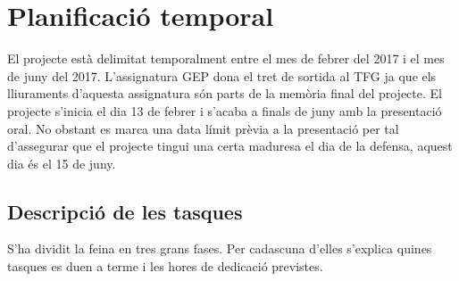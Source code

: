 
\chapter{Planificació temporal} %

\label{Planificacio} %

El projecte està delimitat temporalment entre el mes de febrer del 2017 i el
mes de juny del 2017. L’assignatura GEP dona el tret de sortida al TFG ja
que els lliuraments d’aquesta assignatura són parts de la memòria final del
projecte. El projecte s’inicia el dia 13 de febrer i s’acaba a finals de juny amb la presentació oral. No obstant es marca una data límit prèvia a la presentació per tal d’assegurar que el projecte tingui una certa maduresa el dia de la defensa, aquest dia és el 15 de juny.

\section{Descripció de les tasques}

S’ha dividit la feina en tres grans fases. Per cadascuna d’elles s’explica quines tasques es duen a terme i les hores de dedicació previstes.


